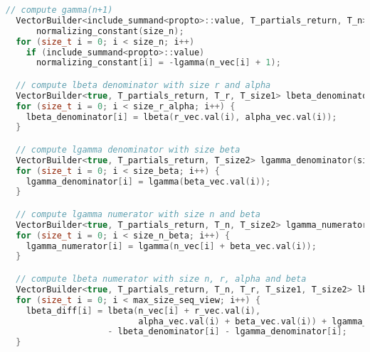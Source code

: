 \documentclass[11pt]{article}
\begin{document}
\begin{lstlisting}[language=c++, style=lgeneral]
  // compute gamma(n+1)
  VectorBuilder<include_summand<propto>::value, T_partials_return, T_n>
      normalizing_constant(size_n);
  for (size_t i = 0; i < size_n; i++)
    if (include_summand<propto>::value)
      normalizing_constant[i] = -lgamma(n_vec[i] + 1);

  // compute lbeta denominator with size r and alpha
  VectorBuilder<true, T_partials_return, T_r, T_size1> lbeta_denominator(size_r_alpha);
  for (size_t i = 0; i < size_r_alpha; i++) {
    lbeta_denominator[i] = lbeta(r_vec.val(i), alpha_vec.val(i));
  }

  // compute lgamma denominator with size beta
  VectorBuilder<true, T_partials_return, T_size2> lgamma_denominator(size_beta);
  for (size_t i = 0; i < size_beta; i++) {
    lgamma_denominator[i] = lgamma(beta_vec.val(i));
  }

  // compute lgamma numerator with size n and beta
  VectorBuilder<true, T_partials_return, T_n, T_size2> lgamma_numerator(size_n_beta);
  for (size_t i = 0; i < size_n_beta; i++) {
    lgamma_numerator[i] = lgamma(n_vec[i] + beta_vec.val(i));
  }

  // compute lbeta numerator with size n, r, alpha and beta
  VectorBuilder<true, T_partials_return, T_n, T_r, T_size1, T_size2> lbeta_diff(max_size_seq_view);
  for (size_t i = 0; i < max_size_seq_view; i++) {
    lbeta_diff[i] = lbeta(n_vec[i] + r_vec.val(i),
                          alpha_vec.val(i) + beta_vec.val(i)) + lgamma_numerator[i]
                    - lbeta_denominator[i] - lgamma_denominator[i];
  }
\end{lstlisting}
\end{document}
